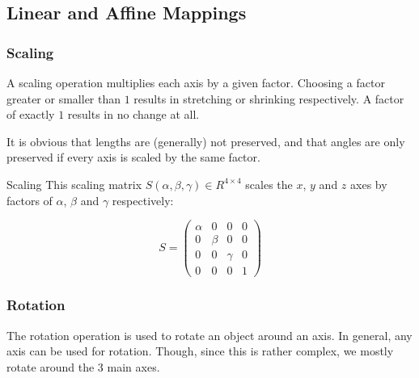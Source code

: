 \documentclass[english]{panikzettel}
\begin{document}
\subsection{Linear and Affine Mappings}
\begin{halfboxl}
\vspace{-\baselineskip}
\subsubsection*{Scaling}

A scaling operation multiplies each axis by a given factor. Choosing a factor greater or smaller than $1$ results in stretching or shrinking respectively. A factor of exactly $1$ results in no change at all.

It is obvious that lengths are (generally) not preserved, and that angles are only preserved if every axis is scaled by the same factor.
\end{halfboxl}%
\begin{halfboxr}
\vspace{-\baselineskip}
\begin{defi}{Scaling}
This scaling matrix $S(\alpha, \beta, \gamma) \in R^{4\times4}$ scales the $x$, $y$ and $z$ axes by factors of $\alpha$, $\beta$ and $\gamma$ respectively:

$$S =\begin{pmatrix} \alpha & 0 & 0 & 0 \\ 0 & \beta & 0 & 0 \\ 0 & 0 & \gamma & 0 \\ 0 & 0 & 0 & 1 \end{pmatrix}$$

\end{defi}
\end{halfboxr}

\subsubsection*{Rotation}

The rotation operation is used to rotate an object around an axis. In general, any axis can be used for rotation. Though, since this is rather complex, we mostly rotate around the 3 main axes.
\end{document}
